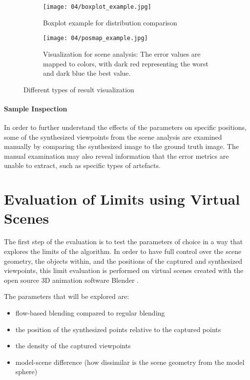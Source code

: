 \begin{figure}
\centering
    \hfill
    \begin{subfigure}[c]{0.45\textwidth}
            \centering
            \texttt{[image: 04/boxplot\_example.jpg]}
            \caption{Boxplot example for distribution comparison} \label{fig:boxplot_example}
    \end{subfigure}%
    \hfill
    \begin{subfigure}[c]{0.4\textwidth}
            \centering
            \texttt{[image: 04/posmap\_example.jpg]}
            \caption{Visualization for scene analysis: The error values are mapped to colors, with dark red representing the worst and dark blue the best value.} \label{fig:posmap_example}
    \end{subfigure}
    \hfill
  \caption{Different types of result visualization}
\end{figure}

\paragraph{Sample Inspection}
In order to further understand the effects of the parameters on specific positions, some of the synthesized viewpoints from the scene analysis are examined manually by comparing the synthesized image to the ground truth image. The manual examination may also reveal information that the error metrics are unable to extract, such as specific types of artefacts.

\section{Evaluation of Limits using Virtual Scenes} \label{sec:limit_eval}
The first step of the evaluation is to test the parameters of choice in a way that explores the limits of the algorithm. In order to have full control over the scene geometry, the objects within, and the positions of the captured and synthesized viewpoints, this limit evaluation is performed on virtual scenes created with the open source 3D animation software Blender \cite{blender}.

The parameters that will be explored are:
\begin{itemize}
  \item flow-based blending compared to regular blending
  \item the position of the synthesized points relative to the captured points
  \item the density of the captured viewpoints
  \item model-scene difference (how dissimilar is the scene geometry from the model sphere)
\end{itemize}

